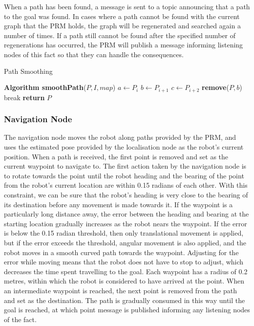 \documentclass[conference]{IEEEtran}
\begin{document}
When a path has been found, a message is sent to a topic announcing that a path to the goal was found. In cases where a path cannot be found with the current graph that the PRM holds, the graph will be regenerated and searched again a number of times. If a path still cannot be found after the specified number of regenerations has occurred, the PRM will publish a message informing listening nodes of this fact so that they can handle the consequences.

\begin{algorithm}
  \caption{Path Smoothing}
  \label{alg:pathsmooth}
  \begin{algorithmic}[1]
    \State \textbf{Algorithm smoothPath}\textnormal{($P, I, map$)}
    \State $a \gets P_i$
    \State $b \gets P_{i+1}$
    \State $c \gets P_{i+2}$
    \State \textbf{remove}($P,b$)
    \EndIf
    \EndFor
    \State break
    \EndIf
    \EndFor
    \State \textbf{return}\textnormal{ $P$}
  \end{algorithmic}
\end{algorithm}

\subsubsection{Navigation Node}
The navigation node moves the robot along paths provided by the PRM, and uses the estimated pose provided by the localisation node as the robot's current position. When a path is received, the first point is removed and set as the current waypoint to navigate to. The first action taken by the navigation node is to rotate towards the point until the robot heading and the bearing of the point from the robot's current location are within 0.15 radians of each other. With this constraint, we can be sure that the robot's heading is very close to the bearing of its destination before any movement is made towards it. If the waypoint is a particularly long distance away, the error between the heading and bearing at the starting location gradually increases as the robot nears the waypoint. If the error is below the 0.15 radian threshold, then only translational movement is applied, but if the error exceeds the threshold, angular movement is also applied, and the robot moves in a smooth curved path towards the waypoint. Adjusting for the error while moving means that the robot does not have to stop to adjust, which decreases the time spent travelling to the goal. Each waypoint has a radius of 0.2 metres, within which the robot is considered to have arrived at the point. When an intermediate waypoint is reached, the next point is removed from the path and set as the destination. The path is gradually consumed in this way until the goal is reached, at which point message is published informing any listening nodes of the fact.
\end{document}
